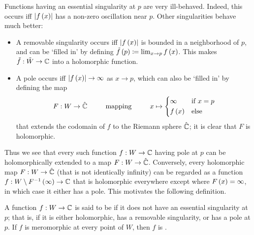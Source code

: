 \documentclass[../Moduli_Spaces_of_Riemann_Surfaces.tex]{subfiles}
\begin{document}
    \begin{remark}
        Functions having an essential singularity at $p$ are very ill-behaved. Indeed, this occurs iff $\left|f\left(x\right)\right|$ has a non-zero oscillation near $p$. Other singularities behave much better:
        \begin{itemize}
            \item A removable singularity occurs iff $\left|f\left(x\right)\right|$ is bounded in a neighborhood of $p$, and can be $\textrm{`}$filled in$\textrm{'}$ by defining $\tilde{f}\left(p\right)\coloneqq\lim_{x\to p}f\left(x\right)$. This makes $\tilde{f}:\tilde{W}\to\mathbb{C}$ into a holomorphic function.
            \vspace{-0.08in}
            \item A pole occurs iff $\left|f\left(x\right)\right|\to\infty$ as $x\to p$, which can also be $\textrm{`}$filled in$\textrm{'}$ by defining the map
                \begin{equation*}
                    F:W\to\RS\ \ \ \ \ \ \ \ \textrm{mapping}\ \ \ \ \ \ \ \ x\mapsto
                    \begin{dcases}
                        \infty & \textrm{if }x=p \\
                        f\l(x\r) & \textrm{else}
                    \end{dcases}
                \end{equation*}
                that extends the codomain of $f$ to the Riemann sphere $\hat{\mathbb{C}}$; it is clear that $F$ is holomorphic.
        \end{itemize}
        Thus we see that every such function $f:W\to\mathbb{C}$ having pole at $p$ can be holomorphically extended to a map $F:W\to\hat{\mathbb{C}}$. Conversely, every holomorphic map $F:W\to\hat{\mathbb{C}}$ (that is not identically infinity) can be regarded as a function $f:W\setminus F^{-1}\left(\infty\right)\to\mathbb{C}$ that is holomorphic everywhere except where $F\left(x\right)=\infty$, in which case it either has a pole. This motivates the following definition.\exqed
    \end{remark}
    \begin{definition}
        A function $f:W\to\mathbb{C}$ is said to be  if it does not have an essential singularity at $p$; that is, if it is either holomorphic, has a removable singularity, or has a pole at $p$. If $f$ is meromorphic at every point of $W$, then $f$ is .
    \end{definition}
\end{document}
